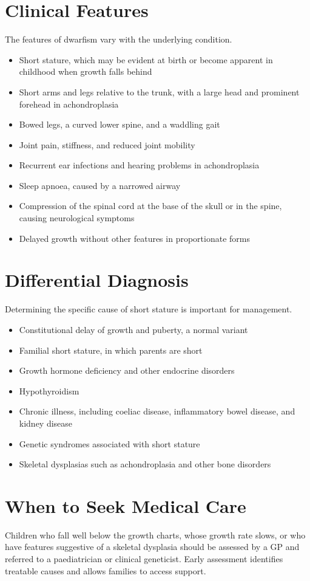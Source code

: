 \section*{Clinical Features}
The features of dwarfism vary with the underlying condition.
\begin{itemize}
    \item Short stature, which may be evident at birth or become apparent in childhood when growth falls behind
    \item Short arms and legs relative to the trunk, with a large head and prominent forehead in achondroplasia
    \item Bowed legs, a curved lower spine, and a waddling gait
    \item Joint pain, stiffness, and reduced joint mobility
    \item Recurrent ear infections and hearing problems in achondroplasia
    \item Sleep apnoea, caused by a narrowed airway
    \item Compression of the spinal cord at the base of the skull or in the spine, causing neurological symptoms
    \item Delayed growth without other features in proportionate forms
\end{itemize}

\section*{Differential Diagnosis}
Determining the specific cause of short stature is important for management.
\begin{itemize}
    \item Constitutional delay of growth and puberty, a normal variant
    \item Familial short stature, in which parents are short
    \item Growth hormone deficiency and other endocrine disorders
    \item Hypothyroidism
    \item Chronic illness, including coeliac disease, inflammatory bowel disease, and kidney disease
    \item Genetic syndromes associated with short stature
    \item Skeletal dysplasias such as achondroplasia and other bone disorders
\end{itemize}

\section*{When to Seek Medical Care}
Children who fall well below the growth charts, whose growth rate slows, or who have features suggestive of a skeletal dysplasia should be assessed by a GP and referred to a paediatrician or clinical geneticist. Early assessment identifies treatable causes and allows families to access support.

